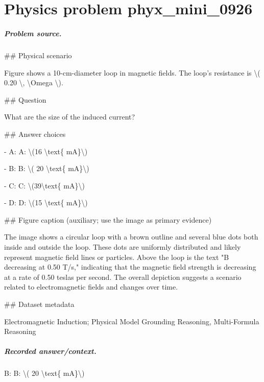 
\chapter{Physics problem phyx\_mini\_0926}
\label{ch:PhyXMiniProblems_problem_phyx_mini_0926}

\paragraph{Problem source.}
\#\# Physical scenario

Figure shows a 10-cm-diameter loop in magnetic fields. The loop's resistance is \textbackslash{}( 0.20 \textbackslash{}, \textbackslash{}Omega \textbackslash{}).

\#\# Question

What are the size of the induced current?

\#\# Answer choices

- A: A: \textbackslash{}(16 \textbackslash{}text\{ mA\}\textbackslash{})

- B: B: \textbackslash{}( 20 \textbackslash{}text\{ mA\}\textbackslash{})

- C: C: \textbackslash{}(39\textbackslash{}text\{ mA\}\textbackslash{})

- D: D: \textbackslash{}(15 \textbackslash{}text\{ mA\}\textbackslash{})

\#\# Figure caption (auxiliary; use the image as primary evidence)

The image shows a circular loop with a brown outline and several blue dots both inside and outside the loop. These dots are uniformly distributed and likely represent magnetic field lines or particles. Above the loop is the text "B decreasing at 0.50 T/s," indicating that the magnetic field strength is decreasing at a rate of 0.50 teslas per second. The overall depiction suggests a scenario related to electromagnetic fields and changes over time.

\#\# Dataset metadata

Electromagnetic Induction; Physical Model Grounding Reasoning, Multi-Formula Reasoning

\paragraph{Recorded answer/context.}
B: B: \textbackslash{}( 20 \textbackslash{}text\{ mA\}\textbackslash{})

